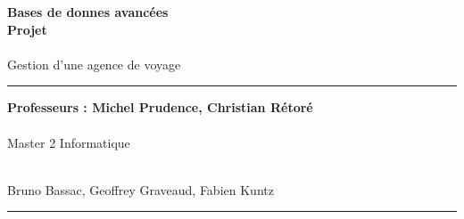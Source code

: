 \documentclass[a4paper]{article}
\newlength{\larg}
\begin{document}
\thispagestyle{empty}

\setlength{\unitlength}{1in}



\begin{flushright}
 \noindent {\rule{\larg}{0.5mm}}
\end{flushright}
\vspace{7mm}
\begin{flushright}
 \Huge{\bf Bases de donnes avanc\'ees} \\
 \Huge{\bf Projet} \\
 ~\\
 \huge{Gestion d'une agence de voyage}\\
\end{flushright}
\vspace{7mm}
\begin{flushright}
 {\rule{\larg}{0.5mm}}
\end{flushright}
\vspace{2mm}
\begin{flushright}
 \large{\bf Professeurs : Michel Prudence, Christian R\'etor\'e} \\
 ~\\
 \large{Master 2 Informatique}\\
 ~\\

\begin{figure}[ht]
\begin{center}
\end{center}
\end{figure}



 \large{Bruno Bassac, Geoffrey Graveaud, Fabien Kuntz}
{\rule{\larg}{0.5mm}}
\end{flushright}

\newpage

\addtolength{\oddsidemargin}{1cm}

\thispagestyle{empty}
\tableofcontents
\newpage

\setcounter{page}{1}










\end{document}
